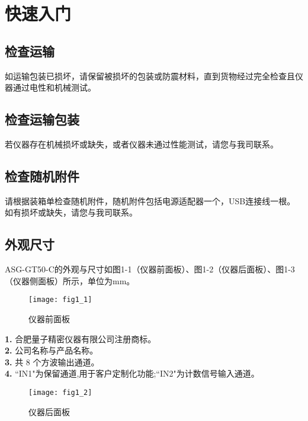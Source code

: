 \chapter{\heiti 快速入门}
\pagestyle{plain}
\setcounter{page}{1}
\setmainfont{Times New Roman}
\section{\heiti 检查运输}
如运输包装已损坏，请保留被损坏的包装或防震材料，直到货物经过完全检查且仪器通过电性和机械测试。

\section{\heiti 检查运输包装}
若仪器存在机械损坏或缺失，或者仪器未通过性能测试，请您与我司联系。

\section{\heiti 检查随机附件}
请根据装箱单检查随机附件，随机附件包括电源适配器一个，USB连接线一根。如有损坏或缺失，请您与我司联系。

\section{\heiti 外观尺寸}
ASG-GT50-C的外观与尺寸如图1-1（仪器前面板）、图1-2（仪器后面板）、图1-3（仪器侧面板）所示，单位为mm。
\begin{figure}[ht]
\centering
\texttt{[image: fig1\_1]}
\caption{仪器前面板}\label{fig:fig1_1}
\end{figure}

\noindent \textbf{1.} 合肥量子精密仪器有限公司注册商标。\\
\textbf{2.}  公司名称与产品名称。\\
\textbf{3.}  共 8 个方波输出通道。\\
\textbf{4.} ``IN1"为保留通道,用于客户定制化功能;``IN2"为计数信号输入通道。

\newpage
\begin{figure}[ht]
\centering
\texttt{[image: fig1\_2]}
\caption{仪器后面板}\label{fig:fig1_2}
\end{figure}

